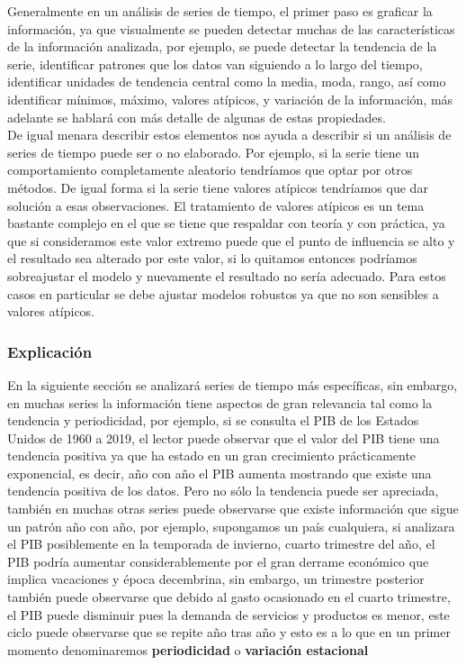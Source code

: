 \documentclass[
  spanish,
]{book}
\theoremstyle{remark}
\begin{document}
Generalmente en un análisis de series de tiempo, el primer paso es graficar la información, ya que visualmente se pueden detectar muchas de las características de la información analizada, por ejemplo, se puede detectar la tendencia de la serie, identificar patrones que los datos van siguiendo a lo largo del tiempo, identificar unidades de tendencia central como la media, moda, rango, así como identificar mínimos, máximo, valores atípicos, y variación de la información, más adelante se hablará con más detalle de algunas de estas propiedades.\\
De igual menara describir estos elementos nos ayuda a describir si un análisis de series de tiempo puede ser o no elaborado. Por ejemplo, si la serie tiene un comportamiento completamente aleatorio tendríamos que optar por otros métodos. De igual forma si la serie tiene valores atípicos tendríamos que dar solución a esas observaciones. El tratamiento de valores atípicos es un tema bastante complejo en el que se tiene que respaldar con teoría y con práctica, ya que si consideramos este valor extremo puede que el punto de influencia se alto y el resultado sea alterado por este valor, si lo quitamos entonces podríamos sobreajustar el modelo y nuevamente el resultado no sería adecuado. Para estos casos en particular se debe ajustar modelos robustos ya que no son sensibles a valores atípicos.

\hypertarget{explicaciuxf3n}{%
\subsubsection*{Explicación}\label{explicaciuxf3n}}

En la siguiente sección se analizará series de tiempo más específicas, sin embargo, en muchas series la información tiene aspectos de gran relevancia tal como la tendencia y periodicidad, por ejemplo, si se consulta el PIB de los Estados Unidos de 1960 a 2019, el lector puede observar que el valor del PIB tiene una tendencia positiva ya que ha estado en un gran crecimiento prácticamente exponencial, es decir, año con año el PIB aumenta mostrando que existe una tendencia positiva de los datos. Pero no sólo la tendencia puede ser apreciada, también en muchas otras series puede observarse que existe información que sigue un patrón año con año, por ejemplo, supongamos un país cualquiera, si analizara el PIB posiblemente en la temporada de invierno, cuarto trimestre del año, el PIB podría aumentar considerablemente por el gran derrame económico que implica vacaciones y época decembrina, sin embargo, un trimestre posterior también puede observarse que debido al gasto ocasionado en el cuarto trimestre, el PIB puede disminuir pues la demanda de servicios y productos es menor, este ciclo puede observarse que se repite año tras año y esto es a lo que en un primer momento denominaremos \textbf{periodicidad} o \textbf{variación estacional}
\end{document}
